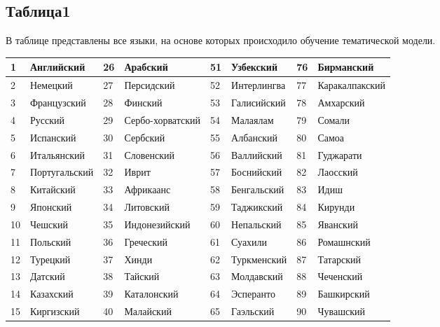 \documentclass[12pt, twoside]{article}
\begin{document}
\subsection{Таблица1}

В таблице представлены все языки, на основе которых происходило обучение тематической модели.

\begin{table}[H]
\begin{tabular}{|l|l|l|l|l|l|l|l|}
\hline
1  & Английский    & 26 & Арабский         & 51 & Узбекский     & 76 & Бирманский           \\ \hline
2  & Немецкий      & 27 & Персидский       & 52 & Интерлингва   & 77 & Каракалпакский       \\ \hline
3  & Французский   & 28 & Финский          & 53 & Галисийский   & 78 & Амхарский            \\ \hline
4  & Русский       & 29 & Сербо-хорватский & 54 & Малаялам      & 79 & Сомали               \\ \hline
5  & Испанский     & 30 & Сербский         & 55 & Албанский     & 80 & Самоа                \\ \hline
6  & Итальянский   & 31 & Словенский       & 56 & Валлийский    & 81 & Гуджарати            \\ \hline
7  & Португальский & 32 & Иврит            & 57 & Боснийский    & 82 & Лаосский             \\ \hline
8  & Китайский     & 33 & Африкаанс        & 58 & Бенгальский   & 83 & Идиш                 \\ \hline
9  & Японский      & 34 & Литовский        & 59 & Таджикский    & 84 & Кирунди              \\ \hline
10 & Чешский       & 35 & Индонезийский    & 60 & Непальский    & 85 & Яванский             \\ \hline
11 & Польский      & 36 & Греческий        & 61 & Суахили       & 86 & Ромашнский           \\ \hline
12 & Турецкий      & 37 & Хинди            & 62 & Туркменский   & 87 & Татарский            \\ \hline
13 & Датский       & 38 & Тайский          & 63 & Молдавский    & 88 & Чеченский            \\ \hline
14 & Казахский     & 39 & Каталонский      & 64 & Эсперанто     & 89 & Башкирский           \\ \hline
15 & Киргизский    & 40 & Малайский        & 65 & Гаэльский     & 90 & Чувашский            \\ \hline

\end{tabular}
\end{table}
\end{document}
